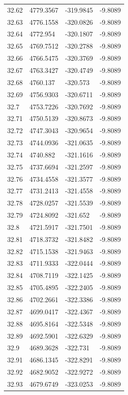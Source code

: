 \begin{table}[H]
\begin{tabular}{llll}
32.62 & 4779.3567 & -319.9845 & -9.8089 \\
32.63 & 4776.1558 & -320.0826 & -9.8089 \\
32.64 & 4772.954 & -320.1807 & -9.8089 \\
32.65 & 4769.7512 & -320.2788 & -9.8089 \\
32.66 & 4766.5475 & -320.3769 & -9.8089 \\
32.67 & 4763.3427 & -320.4749 & -9.8089 \\
32.68 & 4760.137 & -320.573 & -9.8089 \\
32.69 & 4756.9303 & -320.6711 & -9.8089 \\
32.7 & 4753.7226 & -320.7692 & -9.8089 \\
32.71 & 4750.5139 & -320.8673 & -9.8089 \\
32.72 & 4747.3043 & -320.9654 & -9.8089 \\
32.73 & 4744.0936 & -321.0635 & -9.8089 \\
32.74 & 4740.882 & -321.1616 & -9.8089 \\
32.75 & 4737.6694 & -321.2597 & -9.8089 \\
32.76 & 4734.4558 & -321.3577 & -9.8089 \\
32.77 & 4731.2413 & -321.4558 & -9.8089 \\
32.78 & 4728.0257 & -321.5539 & -9.8089 \\
32.79 & 4724.8092 & -321.652 & -9.8089 \\
32.8 & 4721.5917 & -321.7501 & -9.8089 \\
32.81 & 4718.3732 & -321.8482 & -9.8089 \\
32.82 & 4715.1538 & -321.9463 & -9.8089 \\
32.83 & 4711.9333 & -322.0444 & -9.8089 \\
32.84 & 4708.7119 & -322.1425 & -9.8089 \\
32.85 & 4705.4895 & -322.2405 & -9.8089 \\
32.86 & 4702.2661 & -322.3386 & -9.8089 \\
32.87 & 4699.0417 & -322.4367 & -9.8089 \\
32.88 & 4695.8164 & -322.5348 & -9.8089 \\
32.89 & 4692.5901 & -322.6329 & -9.8089 \\
32.9 & 4689.3628 & -322.731 & -9.8089 \\
32.91 & 4686.1345 & -322.8291 & -9.8089 \\
32.92 & 4682.9052 & -322.9272 & -9.8089 \\
32.93 & 4679.6749 & -323.0253 & -9.8089 \\

\end{tabular}
\end{table}
